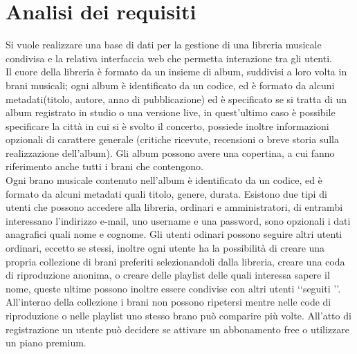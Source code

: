 \section*{Analisi dei requisiti}
Si vuole realizzare una base di dati per la gestione di una libreria musicale
condivisa e la relativa interfaccia web che permetta interazione tra gli
utenti.\\
Il cuore della libreria è formato da un insieme di album, suddivisi a loro
volta in brani musicali; ogni album è identificato da un codice, ed è formato
da alcuni metadati(titolo, autore, anno di pubblicazione) ed è specificato se
si tratta di un album registrato in studio o una versione live, in quest'ultimo
caso è possibile specificare la città in cui si è svolto il concerto, possiede
inoltre informazioni opzionali di carattere generale (critiche ricevute,
recensioni o breve storia sulla realizzazione dell'album).
Gli album possono avere una copertina, a cui fanno riferimento anche tutti i
brani che contengono.\\ Ogni brano musicale contenuto nell'album è
identificato da un codice, ed è formato da alcuni metadati quali titolo,
genere, durata.
Esistono due tipi di utenti che possono accedere alla libreria, ordinari e
amministratori, di entrambi interessano l'indirizzo e-mail, uno username e una
password, sono opzionali i dati anagrafici quali nome e cognome. Gli utenti
odinari possono seguire altri utenti ordinari, eccetto se stessi, inoltre ogni
utente ha la possibilità di creare una propria collezione di brani preferiti
selezionandoli dalla libreria, creare una coda di riproduzione anonima, o
creare delle playlist delle quali interessa sapere il nome, queste ultime
possono inoltre essere condivise con altri utenti \lq\lq seguiti \rq\rq.
All'interno della collezione i brani non possono ripetersi mentre nelle code di
riproduzione o nelle playlist uno stesso brano può comparire più volte.
All'atto di registrazione un utente può decidere se attivare un abbonamento
free o utilizzare un piano premium.
